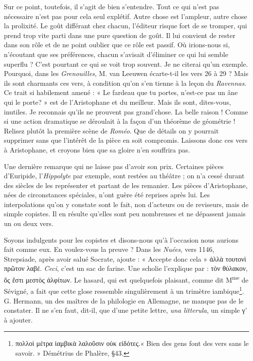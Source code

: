 \documentclass{book}%
\newcommand{\italique}[1]{\textit{#1}}%
\newcommand{\expo}[1]{\textsuperscript{#1}}%
\newcommand{\note}[1]{\footnote{#1}}
\begin{document}
Sur ce point, toutefois, il s'agit de bien s'entendre. Tout ce qui n'est pas nécessaire n'est pas pour cela seul explétif. Autre chose est l'ampleur, autre chose la prolixité. Le goût différant chez chacun, l'éditeur risque fort de se tromper, qui prend trop vite parti dans une pure question de goût. Il lui convient de rester dans son rôle et de ne point oublier que ce rôle est passif. 
Où irions-nous si, n'écoutant que ses préférences, chacun s'avisait d'éliminer ce qui lui semble superflu ? C'est pourtant ce qui se voit trop souvent. Je ne citerai qu'un exemple. Pourquoi, dans les \italique{Grenouilles}, M. van Leeuwen écarte-t-il les vers 26 à 29 ? Mais ils sont charmants ces vers, à condition qu'on s'en tienne à la leçon du \italique{Ravennas}. Ce trait si habilement amené : « Le fardeau que tu portes, n'est-ce pas un âne qui le porte? » est de l'Aristophane et du meilleur. Mais ils sont, dites-vous, inutiles. Je reconnais qu'ils ne prouvent pas grand'chose. La belle raison ! Comme si une action dramatique se déroulait à la façon d'un théorème de géométrie ! Relisez plutôt la première scène de \italique{Roméo}. 
Que de détails on y pourrait supprimer sans que l'intérêt de la pièce en soit compromis. Laissons donc ces vers à Aristophane, et croyons bien que sa gloire n'en souffrira pas. 

Une dernière remarque qui ne laisse pas d'avoir son prix. Certaines pièces d'Euripide, l'\italique{Hippolyte} par exemple, sont restées au théâtre ; on n'a cessé durant des siècles de les représenter et partant de les remanier. Les pièces d'Aristophane, nées de circonstances spéciales, n'ont guère été reprises après lui. Les interpolations qu'on y constate sont le fait, non d'acteurs ou de reviseurs, mais de simple copistes. Il en résulte qu'elles sont peu nombreuses et ne dépassent jamais un ou deux vers. 

Soyons indulgents pour les copistes et disons-nous qu'à l'occasion nous aurions fait comme eux. En voulez-vous la preuve ? Dans les \italique{Nuées}, vers 1146, Strepsiade, après avoir salué Socrate, ajoute : « Accepte donc cela »  ἀλλὰ τουτονὶ πρῶτον λαβέ. \italique{Ceci}, c'est un sac de farine. 
Une scholie l'explique par : τὸν θύλακον, ὅς ἔστι μεστὸς ἀλφίτων. Le hasard, qui est quelquefois plaisant, comme dit M\expo{me} de Sévigné, a fait que cette glose ressemble singulièrement à un trimètre iambique\note{πολλοὶ μέτρα ἰαμβικὰ λαλοῦσιν οὐκ εἰδότες.« Bien des gens font des vers sans le savoir. » Démétrius de Phalère, §43.}. G. Hermann, un des maîtres de la philologie en Allemagne, ne manque pas de le constater. Il ne s'en faut, dit-il, que d'une petite lettre, \italique{una litterula}, un simple γ' à ajouter. 
\end{document}
